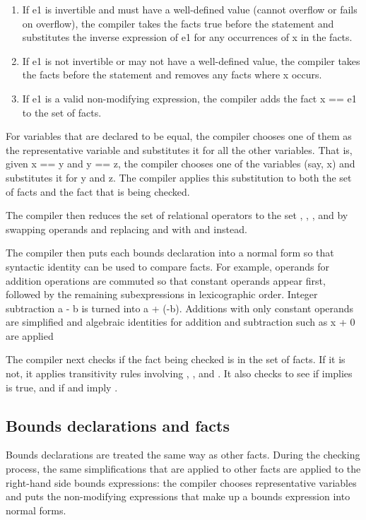 \begin{enumerate}
\item
  If e1 is invertible and must have a well-defined value (cannot
  overflow or fails on overflow), the compiler takes the facts true
  before the statement and substitutes the inverse expression of e1 for
  any occurrences of x in the facts.
\item
  If e1 is not invertible or may not have a well-defined value, the
  compiler takes the facts before the statement and removes any facts
  where x occurs.
\item
  If e1 is a valid non-modifying expression, the compiler adds the fact
  x == e1 to the set of facts.
\end{enumerate}

For variables that are declared to be equal, the compiler chooses one of
them as the representative variable and substitutes it for all the other
variables. That is, given x == y and y == z, the compiler chooses one of
the variables (say, x) and substitutes it for y and z. The compiler
applies this substitution to both the set of facts and the fact that is
being checked.

The compiler then reduces the set of relational operators to the set
\code{<}, \code{<=}, \code{==}, and \code{!=}
by swapping operands and replacing \code{>} and \code{>=} 
with \code{<=} and \code{<} instead.

The compiler then puts each bounds declaration into a normal form so
that syntactic identity can be used to compare facts. For example,
operands for addition operations are commuted so that constant operands
appear first, followed by the remaining subexpressions in lexicographic
order. Integer subtraction a - b is turned into a + (-b). Additions
with only constant operands are simplified and algebraic identities for
addition and subtraction such as x + 0 are applied

The compiler next checks if the fact being checked is in the set of
facts. If it is not, it applies transitivity rules involving
\code{<}, \code{<=}, and \code{==}.
It also checks to see if \code{<}
implies \code{!=} is true, and if \code{<=} and
\code{>=} imply \code{==}.

\subsection{Bounds declarations and facts}

Bounds declarations are treated the same way as other facts. During the
checking process, the same simplifications that are applied to other
facts are applied to the right-hand side bounds expressions: the
compiler chooses representative variables and puts the non-modifying
expressions that make up a bounds expression into normal forms.

